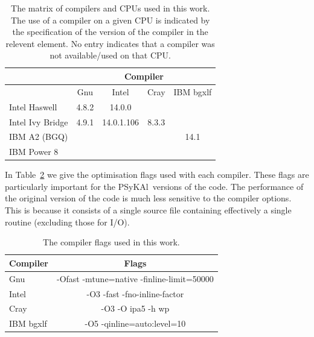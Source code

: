 \documentclass[journal]{IEEEtran}
\newcommand{\psykal}{{PS}y{KA}l\ }
\begin{document}
%
\begin{table}[!t]
\renewcommand{\arraystretch}{1.3}
\caption{The matrix of compilers and CPUs used in this work. The use
  of a compiler on a given CPU is indicated by the specification of
  the version of the compiler in the relevent element. No entry
  indicates that a compiler was not available/used on that CPU.}
\label{TABLE_compilers}
\centering
\begin{tabular}{|l|c|c|c|c|}
\hline
                 & \multicolumn{4}{c|}{Compiler}             \\
\hline
                 & Gnu   & Intel       & Cray    & IBM bgxlf\\
\hline
Intel Haswell    & 4.8.2 & 14.0.0      &         &          \\
Intel Ivy Bridge & 4.9.1 & 14.0.1.106  & 8.3.3   &          \\
IBM A2 (BGQ)     &       &             &         & 14.1     \\
IBM Power 8      &       &             &         &          \\
\hline
\end{tabular}
\end{table}

In Table~\ref{TABLE_compiler_flags} we give the optimisation flags
used with each compiler. These flags are particularly important for
the \psykal versions of the code. The performance of the original
version of the code is much less sensitive to the compiler
options. This is because it consists of a single source file
containing effectively a single routine (excluding those for I/O).
 
\begin{table}[!t]
\renewcommand{\arraystretch}{1.3}
\caption{The compiler flags used in this work.}
\label{TABLE_compiler_flags}
\centering
\begin{tabular}{l|c}
\hline
Compiler  &  Flags \\
\hline
Gnu       & -Ofast -mtune=native -finline-limit=50000    \\
Intel     & -O3 -fast -fno-inline-factor    \\
Cray      & -O3 -O ipa5 -h wp               \\
IBM bgxlf & -O5 -qinline=auto:level=10      \\
\hline
\end{tabular}
\end{table}
\end{document}
